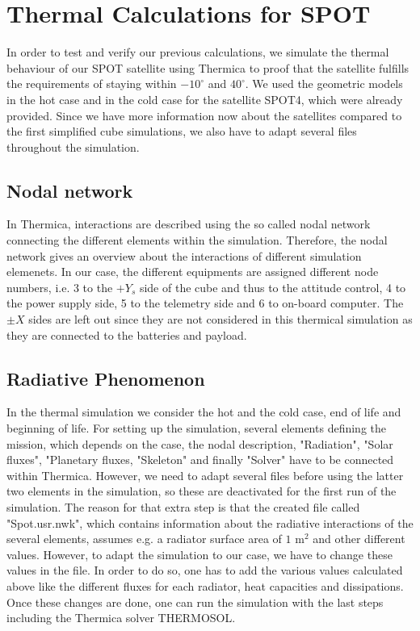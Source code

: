 \section{Thermal Calculations for SPOT}
In order to test and verify our previous calculations, we simulate the thermal behaviour of our SPOT satellite using Thermica to proof that the satellite fulfills the requirements of staying within $-10^{\circ}$ and $40^{\circ}$. We used the geometric models in the hot case and in the cold case for the satellite SPOT4,  which were already provided. Since we have more information now about the satellites compared to the first simplified cube simulations, we also have to adapt several files throughout the simulation. 

\subsection{Nodal network}
In Thermica, interactions are described using the so called nodal network connecting the different elements within the simulation. Therefore, the nodal network gives an overview about the interactions of different simulation elemenets. In our case, the different equipments are assigned different node numbers, i.e. 3 to the $+Y_{s}$ side of the cube and thus to the attitude control, 4 to the power supply side,  5 to the telemetry side and 6 to on-board computer. The $\pm X$ sides are left out since they are not considered in this thermical simulation as they are connected to the batteries and payload.

\subsection{Radiative Phenomenon}
In the thermal simulation we consider the hot and the cold case, end of life and beginning of life. For setting up the simulation, several elements defining the mission, which depends on the case, the nodal description, "Radiation", "Solar fluxes", "Planetary fluxes, "Skeleton" and finally "Solver" have to be connected within Thermica. However, we need to adapt several files before using the latter two elements in the simulation, so these are deactivated for the first run of the simulation.  
The reason for that extra step is that the created file called "Spot.usr.nwk", which contains information about the radiative interactions of the several elements, assumes e.g. a radiator surface area of $1$ m$^{2}$ and other different values. However, to adapt the simulation to our case, we have to change these values in the file. In order to do so, one has to add the various values calculated above like the different fluxes for each radiator, heat capacities and dissipations. Once these changes are done, one can run the simulation with the last steps including the Thermica solver THERMOSOL.


